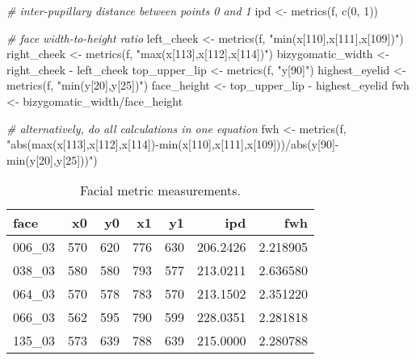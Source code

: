 \documentclass[
  doc,floatsintext]{apa6}
\newenvironment{Shaded}{\begin{snugshade}}{\end{snugshade}}
\newcommand{\CommentTok}[1]{\textcolor[rgb]{0.56,0.35,0.01}{\textit{#1}}}
\newcommand{\DecValTok}[1]{\textcolor[rgb]{0.00,0.00,0.81}{#1}}
\newcommand{\FunctionTok}[1]{\textcolor[rgb]{0.00,0.00,0.00}{#1}}
\newcommand{\NormalTok}[1]{#1}
\newcommand{\OtherTok}[1]{\textcolor[rgb]{0.56,0.35,0.01}{#1}}
\newcommand{\SpecialCharTok}[1]{\textcolor[rgb]{0.00,0.00,0.00}{#1}}
\newcommand{\StringTok}[1]{\textcolor[rgb]{0.31,0.60,0.02}{#1}}
\begin{document}
\begin{Shaded}
\begin{Highlighting}[]
\CommentTok{\# inter{-}pupillary distance between points 0 and 1}
\NormalTok{ipd }\OtherTok{\textless{}{-}} \FunctionTok{metrics}\NormalTok{(f, }\FunctionTok{c}\NormalTok{(}\DecValTok{0}\NormalTok{, }\DecValTok{1}\NormalTok{))}

\CommentTok{\# face width{-}to{-}height ratio}
\NormalTok{left\_cheek }\OtherTok{\textless{}{-}} \FunctionTok{metrics}\NormalTok{(f, }\StringTok{"min(x[110],x[111],x[109])"}\NormalTok{)}
\NormalTok{right\_cheek }\OtherTok{\textless{}{-}} \FunctionTok{metrics}\NormalTok{(f, }\StringTok{"max(x[113],x[112],x[114])"}\NormalTok{)}
\NormalTok{bizygomatic\_width }\OtherTok{\textless{}{-}}\NormalTok{ right\_cheek }\SpecialCharTok{{-}}\NormalTok{ left\_cheek}
\NormalTok{top\_upper\_lip }\OtherTok{\textless{}{-}} \FunctionTok{metrics}\NormalTok{(f, }\StringTok{"y[90]"}\NormalTok{)}
\NormalTok{highest\_eyelid }\OtherTok{\textless{}{-}} \FunctionTok{metrics}\NormalTok{(f, }\StringTok{"min(y[20],y[25])"}\NormalTok{)}
\NormalTok{face\_height }\OtherTok{\textless{}{-}}\NormalTok{ top\_upper\_lip }\SpecialCharTok{{-}}\NormalTok{ highest\_eyelid}
\NormalTok{fwh }\OtherTok{\textless{}{-}}\NormalTok{ bizygomatic\_width}\SpecialCharTok{/}\NormalTok{face\_height}

\CommentTok{\# alternatively, do all calculations in one equation}
\NormalTok{fwh }\OtherTok{\textless{}{-}} \FunctionTok{metrics}\NormalTok{(f, }\StringTok{"abs(max(x[113],x[112],x[114]){-}min(x[110],x[111],x[109]))/abs(y[90]{-}min(y[20],y[25]))"}\NormalTok{)}
\end{Highlighting}
\end{Shaded}

\begin{table}

\caption{\label{tab:metrics}Facial metric measurements.}
\centering
\begin{tabular}[t]{l|r|r|r|r|r|r}
\hline
face & x0 & y0 & x1 & y1 & ipd & fwh\\
\hline
006\_03 & 570 & 620 & 776 & 630 & 206.2426 & 2.218905\\
\hline
038\_03 & 580 & 580 & 793 & 577 & 213.0211 & 2.636580\\
\hline
064\_03 & 570 & 578 & 783 & 570 & 213.1502 & 2.351220\\
\hline
066\_03 & 562 & 595 & 790 & 599 & 228.0351 & 2.281818\\
\hline
135\_03 & 573 & 639 & 788 & 639 & 215.0000 & 2.280788\\
\hline
\end{tabular}
\end{table}
\end{document}

